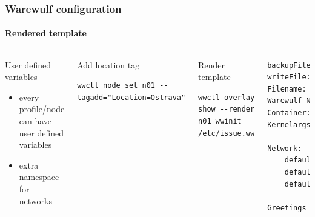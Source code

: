 \documentclass[aspectratio=169]{beamer}
\begin{document}
\begin{frame}[fragile]
\frametitle{Warewulf configuration}
\framesubtitle{Rendered template}
\begin{columns}
\begin{block}{User defined variables}
  \begin{itemize}
    \item every profile/node can have user defined variables\\
    \item extra namespace for networks
  \end{itemize}
\end{block}
\begin{block}{Add location tag}
\begin{lstlisting}[style=wwctl]
wwctl node set n01 --tagadd="Location=Ostrava"
\end{lstlisting}
\end{block}
\begin{block}{Render template}
\begin{lstlisting}[style=wwctl]
wwctl overlay show --render n01 wwinit /etc/issue.ww
\end{lstlisting}
\end{block}
\begin{lstlisting}[language=xml,style=ww,caption=renderd /etc/issue]
backupFile: true
writeFile: true
Filename: /etc/issue
Warewulf Node:      n01
Container:          leap
Kernelargs:         quiet crashkernel=no vga=791 net.naming-scheme=v238

Network:
    default: eth0
    default: 172.16.130.101/24
    default: 52:54:00:4e:cb:1d

Greetings from Ostrava
\end{lstlisting}
\end{columns}
\end{frame}
\end{document}
